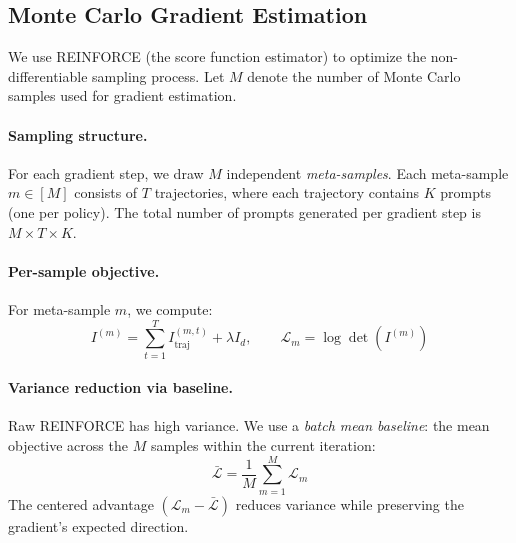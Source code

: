 \documentclass{article}
\begin{document}
\subsection{Monte Carlo Gradient Estimation}
\label{sec:reinforce:gradient}

We use REINFORCE (the score function estimator) to optimize the non-differentiable sampling process. Let $M$ denote the number of Monte Carlo samples used for gradient estimation.

\paragraph{Sampling structure.} For each gradient step, we draw $M$ independent \emph{meta-samples}. Each meta-sample $m \in [M]$ consists of $T$ trajectories, where each trajectory contains $K$ prompts (one per policy). The total number of prompts generated per gradient step is $M \times T \times K$.

\paragraph{Per-sample objective.} For meta-sample $m$, we compute:
\begin{equation}
    I^{(m)} = \sum_{t=1}^{T} I_{\text{traj}}^{(m,t)} + \lambda I_d, \qquad \mathcal{L}_m = \log\det(I^{(m)})
\end{equation}

\paragraph{Variance reduction via baseline.} Raw REINFORCE has high variance. We use a \emph{batch mean baseline}: the mean objective across the $M$ samples within the current iteration:
\begin{equation}
    \bar{\mathcal{L}} = \frac{1}{M} \sum_{m=1}^{M} \mathcal{L}_m
\end{equation}
The centered advantage $(\mathcal{L}_m - \bar{\mathcal{L}})$ reduces variance while preserving the gradient's expected direction.
\end{document}
